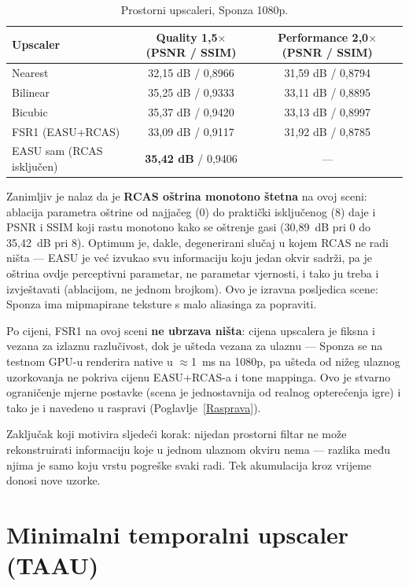 \documentclass{mathos}
\begin{document}
\begin{table}[hbtp]
\centering
\begin{tabular}{|l|c|c|}\hline
Upscaler & Quality 1,5$\times$ (PSNR / SSIM) & Performance 2,0$\times$ (PSNR / SSIM) \\\hline
Nearest & 32,15 dB / 0,8966 & 31,59 dB / 0,8794 \\\hline
Bilinear & 35,25 dB / 0,9333 & 33,11 dB / 0,8895 \\\hline
Bicubic & 35,37 dB / 0,9420 & 33,13 dB / 0,8997 \\\hline
FSR1 (EASU+RCAS) & 33,09 dB / 0,9117 & 31,92 dB / 0,8785 \\\hline
EASU sam (RCAS isključen) & \textbf{35,42 dB} / 0,9406 & --- \\\hline
\end{tabular}
\caption{Prostorni upscaleri, Sponza 1080p.}
\label{table_m3_rezultati}
\end{table}

Zanimljiv je nalaz da je \textbf{RCAS oštrina monotono štetna} na ovoj sceni:
ablacija parametra oštrine od najjačeg (0) do praktički isključenog (8) daje
i PSNR i SSIM koji rastu monotono kako se oštrenje gasi (30,89~dB pri 0 do
35,42~dB pri 8). Optimum je, dakle, degenerirani slučaj u kojem RCAS ne radi
ništa — EASU je već izvukao svu informaciju koju jedan okvir sadrži, pa je
oštrina ovdje perceptivni parametar, ne parametar vjernosti, i tako ju treba
i izvještavati (ablacijom, ne jednom brojkom). Ovo je izravna posljedica
scene: Sponza ima mipmapirane teksture s malo aliasinga za popraviti.

Po cijeni, FSR1 na ovoj sceni \textbf{ne ubrzava ništa}: cijena upscalera je
fiksna i vezana za izlaznu razlučivost, dok je ušteda vezana za ulaznu —
Sponza se na testnom GPU-u renderira native u $\approx$1~ms na 1080p, pa
ušteda od nižeg ulaznog uzorkovanja ne pokriva cijenu EASU+RCAS-a i tone
mappinga. Ovo je stvarno ograničenje mjerne postavke (scena je jednostavnija
od realnog opterećenja igre) i tako je i navedeno u raspravi
(Poglavlje~\ref{Rasprava}).

Zaključak koji motivira sljedeći korak: nijedan prostorni filtar ne može
rekonstruirati informaciju koje u jednom ulaznom okviru nema — razlika među
njima je samo koju vrstu pogreške svaki radi. Tek akumulacija kroz vrijeme
donosi nove uzorke.

\section{Minimalni temporalni upscaler (TAAU)}
\end{document}
